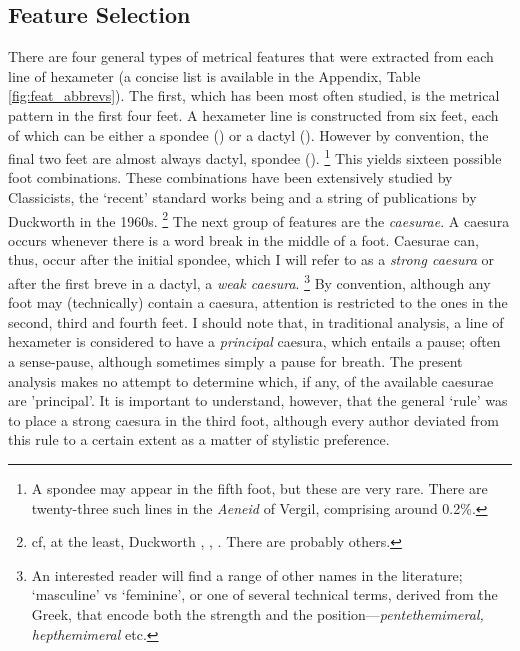 \documentclass[11pt,a4paper]{scrartcl} %
\begin{document}
{\subsection{Feature Selection}
There are four general types of metrical features that were extracted from each line of hexameter (a concise list is available in the Appendix, Table \ref{fig:feat_abbrevs}). The first, which has been most often studied, is the metrical pattern in the first four feet. A hexameter line is constructed from six feet, each of which can be either a spondee (\metricsymbols{_ _}) or a dactyl (). However by convention, the final two feet are almost always dactyl, spondee ().%
\footnote{A spondee may appear in the fifth foot, but these are very rare. There are twenty-three such lines in the \textit{Aeneid} of Vergil, comprising around 0.2\%.}
This yields sixteen possible foot combinations. These combinations have been extensively studied by Classicists, the `recent' standard works being  and a string of publications by Duckworth in the 1960s.%
\footnote{cf, at the least, Duckworth , ,  . There are probably others.}
The next group of features are the \textit{caesurae}. A caesura occurs whenever there is a word break in the middle of a foot. Caesurae can, thus, occur after the initial spondee, which I will refer to as a \textit{strong caesura} or after the first breve in a dactyl, a \textit{weak caesura}.%
\footnote{An interested reader will find a range of other names in the literature; `masculine' vs `feminine', or one of several technical terms, derived from the Greek, that encode both the strength and the position---\textit{pentethemimeral, hepthemimeral} etc.}
By convention, although any foot may (technically) contain a caesura, attention is restricted to the ones in the second, third and fourth feet. I should note that, in traditional analysis, a line of hexameter is considered to have a \textit{principal} caesura, which entails a pause; often a sense-pause, although sometimes simply a pause for breath. The present analysis makes no attempt to determine which, if any, of the available caesurae are 'principal'. It is important to understand, however, that the general `rule' was to place a strong caesura in the third foot, although every author deviated from this rule to a certain extent as a matter of stylistic preference.

}
\end{document}
